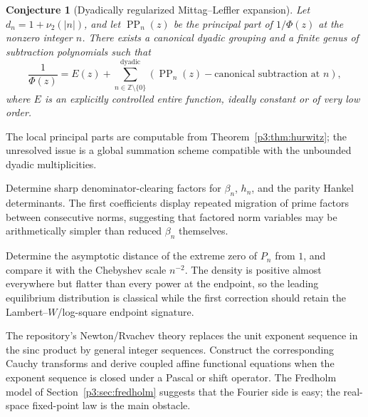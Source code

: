 \documentclass[11pt,oneside]{article}
\newtheorem{conjecture}[theorem]{Conjecture}
\theoremstyle{definition}
\begin{document}
\begin{conjecture}[Dyadically regularized Mittag--Leffler expansion]\label{p3:conj:ML}
Let \(d_n=1+\nu_2(|n|)\), and let \(\operatorname{PP}_n(z)\) be the principal part of
\(1/\Phi(z)\) at the nonzero integer \(n\).  There exists a canonical dyadic grouping and a
finite genus of subtraction polynomials such that
\begin{equation}
 \frac1{\Phi(z)}
 =E(z)+\sum_{n\in\mathbb Z\setminus\{0\}}^{\mathrm{dyadic}}
 \left(\operatorname{PP}_n(z)-\text{canonical subtraction at }n\right), \label{p3:eq:ML-conj}
\end{equation}
where \(E\) is an explicitly controlled entire function, ideally constant or of very low
order.
\end{conjecture}

The local principal parts are computable from Theorem~\ref{p3:thm:hurwitz}; the unresolved
issue is a global summation scheme compatible with the unbounded dyadic multiplicities.

\begin{problem}
Determine sharp denominator-clearing factors for \(\beta_n\), \(h_n\), and the parity
Hankel determinants.  The first coefficients display repeated migration of prime factors
between consecutive norms, suggesting that factored norm variables may be arithmetically
simpler than reduced \(\beta_n\) themselves.
\end{problem}

\begin{problem}
Determine the asymptotic distance of the extreme zero of \(P_n\) from \(1\), and compare it
with the Chebyshev scale \(n^{-2}\).  The density is positive almost everywhere but flatter
than every power at the endpoint, so the leading equilibrium distribution is classical
while the first correction should retain the Lambert--\(W\)/log-square endpoint signature.
\end{problem}

\begin{problem}
The repository's Newton/Rvachev theory replaces the unit exponent sequence in the sinc
product by general integer sequences.  Construct the corresponding Cauchy transforms and
derive coupled affine functional equations when the exponent sequence is closed under a
Pascal or shift operator.  The Fredholm model of Section~\ref{p3:sec:fredholm} suggests that
the Fourier side is easy; the real-space fixed-point law is the main obstacle.
\end{problem}
\end{document}
